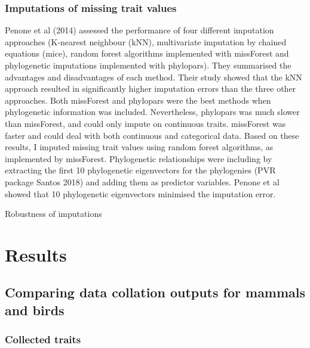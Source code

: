 \subsubsection{Imputations of missing trait values}
Penone et al (2014) assessed the performance of four different imputation approaches (K-nearest neighbour (kNN), multivariate imputation by chained equations (mice), random forest algorithms implemented with missForest and phylogenetic imputations implemented with phylopars). They summarised the advantages and disadvantages of each method. Their study showed that the kNN approach resulted in significantly higher imputation errors than the three other approaches. Both missForest and phylopars were the best methods when phylogenetic information was included. Nevertheless, phylopars was much slower than missForest, and could only impute on continuous traits. missForest was faster and could deal with both continuous and categorical data.
Based on these results, I imputed missing trait values using random forest algorithms, as implemented by missForest. Phylogenetic relationships were including by extracting the first 10 phylogenetic eigenvectors for the phylogenies (PVR package Santos 2018) and adding them as predictor variables. Penone et al showed that 10 phylogenetic eigenvectors minimised the imputation error. 



Robustness of imputations

\section{Results}

\subsection{Comparing data collation outputs for mammals and birds}

\subsubsection{Collected traits}

